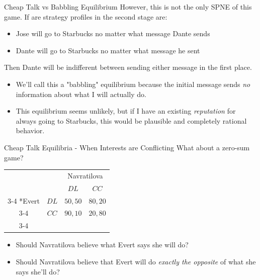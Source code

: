 \begin{frame}{Cheap Talk vs Babbling Equilibrium}
  However, this is not the only SPNE of this game.
  If are strategy profiles in the second stage are:
  \begin{itemize}
    \item 
    Jose will go to Starbucks no matter what message Dante sends
    \item
    Dante will go to Starbucks no matter what message he sent
  \end{itemize}
  Then Dante will be indifferent between sending either message in the first place.

  \begin{itemize}
    \item 
    We'll call this a \alert{"babbling" equilibrium} 
    because the initial message sends \textit{no} information about what 
    I will actually do.
    \item 
    This equilibrium seems unlikely, but if I have an existing \textit{reputation}
    for always going to Starbucks, this would be plausible 
    and completely rational behavior.
  \end{itemize}
\end{frame}


\begin{frame}{Cheap Talk Equilibria - When Interests are Conflicting}
  What about a zero-sum game?
  \begin{table}[!h]
    \centering
    \begin{tabular}{cc|c|c|}
    & \multicolumn{1}{c}{} & \multicolumn{2}{c}{Navratilova}\\
    & \multicolumn{1}{c}{} & \multicolumn{1}{c}{$DL$}  & \multicolumn{1}{c}{$CC$} \\\cline{3-4}
    \multirow{2}*{Evert}  & $DL$ & $50, 50$ & $80,20$ \\\cline{3-4}
                          & $CC$ & $90, 10$ & $20,80$ \\\cline{3-4}
  \end{tabular}
  \end{table}
  \begin{itemize}
    \item  
    Should Navratilova believe what Evert says she will do?
    \item 
    Should Navratilova believe that Evert will do 
    \textit{exactly the opposite} of what she says she'll do?
  \end{itemize}
\end{frame}

